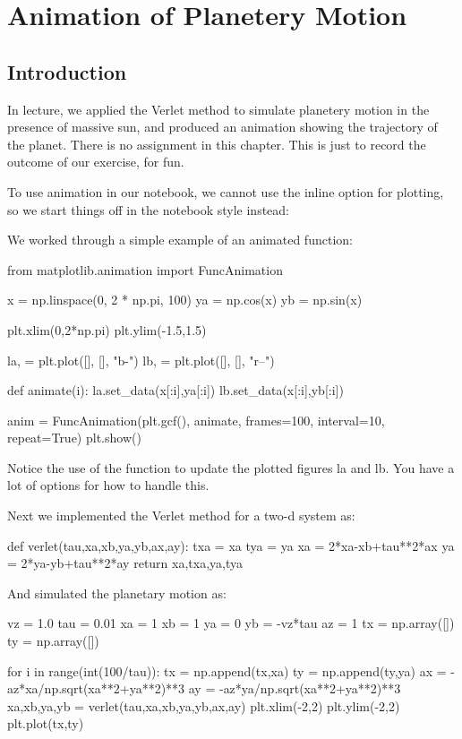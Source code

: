 \chapter{Animation of Planetery Motion}

\section{Introduction}

In lecture, we applied the Verlet method to simulate planetery motion
in the presence of massive sun, and produced an animation showing the
trajectory of the planet.  There is no assignment in this chapter.
This is just to record the outcome of our exercise, for fun.

To use animation in our notebook, we cannot use the inline option for
plotting, so we start things off in the notebook style instead:
\begin{python}
\end{python}

We worked through a simple example of an animated function:
\begin{python}
from matplotlib.animation import FuncAnimation

x = np.linspace(0, 2 * np.pi, 100)
ya = np.cos(x)
yb = np.sin(x)

plt.xlim(0,2*np.pi)
plt.ylim(-1.5,1.5)

la, = plt.plot([], [], "b-")
lb, = plt.plot([], [], "r--")

def animate(i):
    la.set_data(x[:i],ya[:i])
    lb.set_data(x[:i],yb[:i])
    
anim = FuncAnimation(plt.gcf(), animate, frames=100, interval=10, repeat=True)
plt.show()
\end{python}
Notice the use of the  function to update the plotted figures
la and lb.  You have a lot of options for how to handle this.

Next we implemented the Verlet method for a two-d system as:

\begin{python}
def verlet(tau,xa,xb,ya,yb,ax,ay):
    txa = xa
    tya = ya    
    xa = 2*xa-xb+tau**2*ax
    ya = 2*ya-yb+tau**2*ay    
    return xa,txa,ya,tya
\end{python}

And simulated the planetary motion as:
\begin{python}
vz = 1.0 
tau = 0.01
xa = 1
xb = 1
ya = 0
yb = -vz*tau
az = 1
tx = np.array([])
ty = np.array([])

for i in range(int(100/tau)):
    tx = np.append(tx,xa)
    ty = np.append(ty,ya)    
    ax = -az*xa/np.sqrt(xa**2+ya**2)**3
    ay = -az*ya/np.sqrt(xa**2+ya**2)**3    
    xa,xb,ya,yb = verlet(tau,xa,xb,ya,yb,ax,ay)
plt.xlim(-2,2)
plt.ylim(-2,2)
plt.plot(tx,ty)
\end{python}

